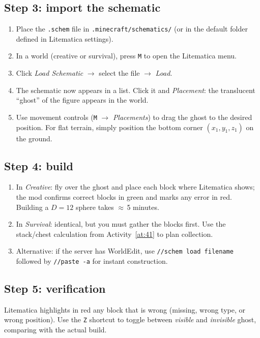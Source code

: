 \documentclass[12pt,a4paper]{scrartcl}
\newcommand{\cmd}[1]{\textcolor{earth}{\texttt{\small #1}}}
\begin{document}
\subsection{Step 3: import the schematic}
\begin{enumerate}[leftmargin=1.5em,itemsep=0.15em,topsep=0.3em]
  \item Place the \texttt{.schem} file in \texttt{.minecraft/schematics/} (or in the default folder defined in Litematica settings).
  \item In a world (creative or survival), press \texttt{M} to open the Litematica menu.
  \item Click \emph{Load Schematic} $\rightarrow$ select the file $\rightarrow$ \emph{Load}.
  \item The schematic now appears in a list. Click it and \emph{Placement}: the translucent \enquote{ghost} of the figure appears in the world.
  \item Use movement controls (\texttt{M} $\rightarrow$ \emph{Placements}) to drag the ghost to the desired position. For flat terrain, simply position the bottom corner $(x_1, y_1, z_1)$ on the ground.
\end{enumerate}

\subsection{Step 4: build}
\begin{enumerate}[leftmargin=1.5em,itemsep=0.15em,topsep=0.3em]
  \item In \emph{Creative}: fly over the ghost and place each block where Litematica shows; the mod confirms correct blocks in green and marks any error in red. Building a $D = 12$ sphere takes $\approx$\,5 minutes.
  \item In \emph{Survival}: identical, but you must gather the blocks first. Use the stack/chest calculation from Activity~\ref{at:41} to plan collection.
  \item Alternative: if the server has WorldEdit, use \cmd{//schem load filename} followed by \cmd{//paste -a} for instant construction.
\end{enumerate}

\subsection{Step 5: verification}
Litematica highlights in red any block that is wrong (missing, wrong type, or wrong position). Use the \texttt{Z} shortcut to toggle between \emph{visible} and \emph{invisible} ghost, comparing with the actual build.
\end{document}
